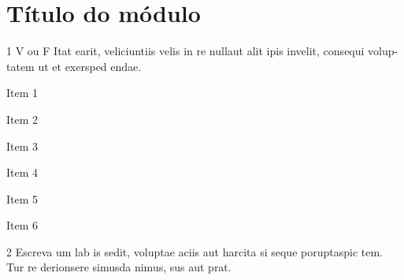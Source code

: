 \openany
\chapter{Título do módulo}




\begin{mdframed}[leftmargin=0pt,linecolor=red]
\setlength{\leftskip}{2cm}
\lipsum[1-4]
\end{mdframed}

\pagebreak


\num{1} V ou F Itat earit, veliciuntiis velis in re nullaut alit ipis invelit, consequi volup-
tatem ut et exersped endae.

\begin{boxlist}
    \item Item 1  

    \item Item 2

    \item Item 3

    \item Item 4

    \item Item 5

    \item Item 6
\end{boxlist}

\num{2} Escreva um lab is sedit, voluptae aciis aut harcita si seque poruptaspic tem.
Tur re derionsere simusda nimus, sus aut prat.

